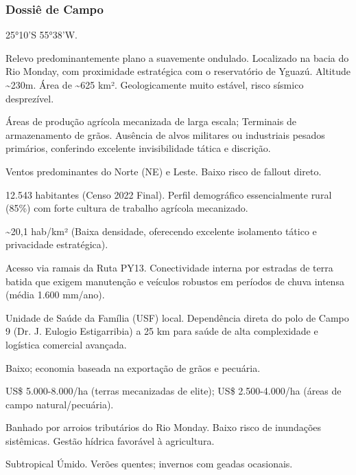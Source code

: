 \subsubsection{Dossiê de Campo}
\begin{description}[style=nextline,leftmargin=0.5cm,font=\bfseries]
\item[Coordenadas]  25°10'S 55°38'W.
\item[Topografia]  Relevo predominantemente plano a suavemente ondulado. Localizado na bacia do Rio Monday, com proximidade estratégica com o reservatório de Yguazú. Altitude \textasciitilde 230m. Área de \textasciitilde 625 km². Geologicamente muito estável, risco sísmico desprezível.
\item[Alvos Estratégicos]  Áreas de produção agrícola mecanizada de larga escala; Terminais de armazenamento de grãos. Ausência de alvos militares ou industriais pesados primários, conferindo excelente invisibilidade tática e discrição.
\item[Fallout]  Ventos predominantes do Norte (NE) e Leste. Baixo risco de fallout direto.
\item[População]  12.543 habitantes (Censo 2022 Final). Perfil demográfico essencialmente rural (85\%) com forte cultura de trabalho agrícola mecanizado.
\item[Densidade]  \textasciitilde 20,1 hab/\allowbreak km² (Baixa densidade, oferecendo excelente isolamento tático e privacidade estratégica).
\item[Vias de Acesso]  Acesso via ramais da Ruta PY13. Conectividade interna por estradas de terra batida que exigem manutenção e veículos robustos em períodos de chuva intensa (média 1.600 mm/\allowbreak ano).
\item[Serviços]  Unidade de Saúde da Família (USF) local. Dependência direta do polo de Campo 9 (Dr. J. Eulogio Estigarribia) a 25 km para saúde de alta complexidade e logística comercial avançada.
\item[Custo de Vida]  Baixo; economia baseada na exportação de grãos e pecuária.
\item[Preço da Terra]  US\$ 5.000-8.000/\allowbreak ha (terras mecanizadas de elite); US\$ 2.500-4.000/\allowbreak ha (áreas de campo natural/\allowbreak pecuária).
\item[Hidrologia]  Banhado por arroios tributários do Rio Monday. Baixo risco de inundações sistêmicas. Gestão hídrica favorável à agricultura.
\item[Clima]  Subtropical Úmido. Verões quentes; invernos com geadas ocasionais.

\end{description}
